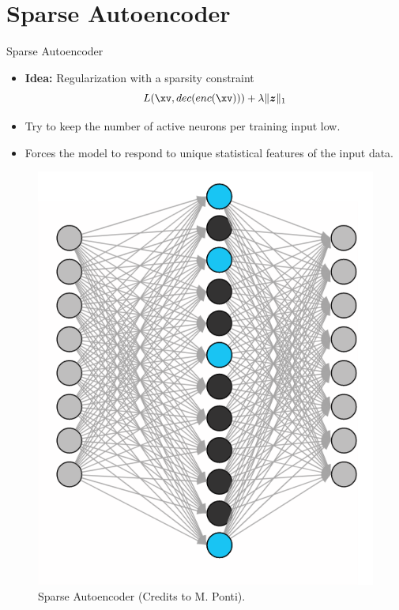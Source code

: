 \section{Sparse Autoencoder}

\begin{vbframe}{Sparse Autoencoder}

\begin{itemize}
  \item \textbf{Idea:} Regularization with a sparsity constraint
  $$
    L(\xv, dec(enc(\xv))) + \lambda \|\bm{z}\|_1 
  $$
\item Try to keep the number of active neurons per training input low. 
\item Forces the model to respond to unique statistical features of the input data. 
\end{itemize}

\vspace*{-0.3cm}

\begin{figure}[h]
    \centering
    \includegraphics[width=0.25\linewidth]{plots/AE_sparse.png}
    \caption{Sparse Autoencoder (Credits to M. Ponti).} 
\end{figure}

\end{vbframe}


